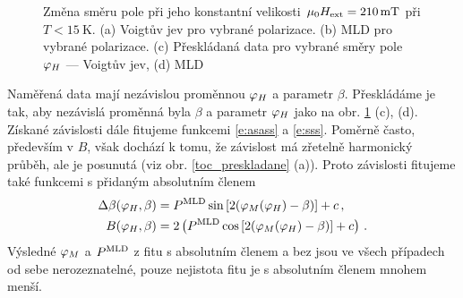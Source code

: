 \begin{figure}[htbp]\centering
{}
	\caption{Změna směru pole při jeho konstantní velikosti $\mu_0 H_\text{ext}=\SI{210}{\milli\tesla}$ při $T<\SI{15}{\kelvin}$. (a) Voigtův jev pro vybrané polarizace. (b) MLD pro vybrané polarizace. (c) Přeskládaná data pro vybrané směry pole $\varphi_H$ --- Voigtův jev, (d) MLD}\label{toc_hrube}
\end{figure}

Naměřená data mají nezávislou proměnnou $\varphi_H$ a parametr $\beta$. Přeskládáme je tak, aby nezávislá proměnná byla $\beta$ a parametr $\varphi_H$ jako na obr. \ref{toc_hrube} (c), (d).
Získané závislosti dále fitujeme funkcemi \eqref{e:asass} a \eqref{e:sss}. Poměrně často, především v $B$, však dochází k tomu, že závislost má zřetelně harmonický průběh, ale je posunutá (viz obr. \ref{toc_preskladane} (a)). Proto závislosti fitujeme také funkcemi s přidaným absolutním členem
\begin{equation} \label{e:tocsc}
\begin{aligned}
\Delta \beta(\varphi_H, \beta) &= P^{\text{MLD}} \sin \left[ 2(\varphi_M(\varphi_H)-\beta) \right]+c \,, \\
B(\varphi_H, \beta) &= 2 \left(P^{\text{MLD}} \cos \left[ 2(\varphi_M(\varphi_H)-\beta) \right]+c \right) \,.
\end{aligned}
\end{equation}
Výsledné $\varphi_M$ a $P^{\text{MLD}}$ z fitu s absolutním členem a bez jsou ve všech případech od sebe nerozeznatelné, pouze nejistota fitu je s absolutním členem mnohem menší.

